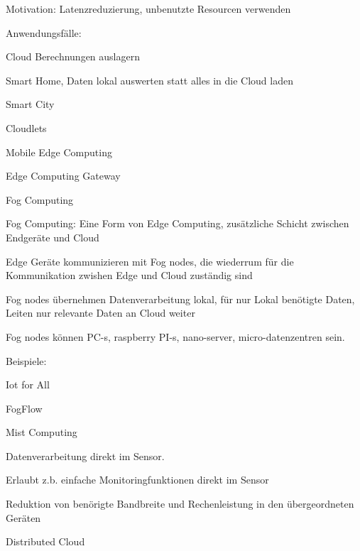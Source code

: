 \begin{notes}
\begin{notes}
        \item Motivation: Latenzreduzierung, unbenutzte Resourcen verwenden
        \item Anwendungsfälle:
        \begin{notes}
            \item Cloud Berechnungen auslagern
            \item Smart Home, Daten lokal auswerten statt alles in die Cloud laden
            \item Smart City
        \end{notes}
        \item Cloudlets
        \item Mobile Edge Computing
        \item Edge Computing Gateway
        \item Fog Computing
        \begin{notes} 
            \item Fog Computing: Eine Form von Edge Computing, zusätzliche Schicht zwischen Endgeräte und Cloud
            \item Edge Geräte kommunizieren mit Fog nodes, die wiederrum für die Kommunikation zwishen Edge und Cloud zuständig sind
            \item Fog nodes übernehmen Datenverarbeitung lokal, für nur Lokal benötigte Daten, Leiten nur relevante Daten an Cloud weiter
            \item Fog nodes können PC-s, raspberry PI-s, nano-server, micro-datenzentren sein. \cite{Mahmud2020}
            \item Beispiele:
            \begin{notes} 
                \item Iot for All
                \item FogFlow
            \end{notes}
        \end{notes}
        \item Mist Computing
        \begin{notes} 
            \item Datenverarbeitung direkt im Sensor.
            \item Erlaubt z.b. einfache Monitoringfunktionen direkt im Sensor
            \item Reduktion von benörigte Bandbreite und Rechenleistung in den übergeordneten Geräten
        \end{notes}
        \item Distributed Cloud

\end{notes}
\end{notes}
